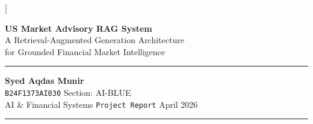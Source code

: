 \documentclass[10pt,a4paper,twocolumn]{article}
\begin{document}
\twocolumn[{%
  \begin{@twocolumnfalse}

    \vspace*{0.4cm}
    \begin{center}
      {\LARGE\bfseries\color{primaryblue}
        US Market Advisory RAG System\\[0.3em]
      }
      {\large\color{darkgray}
        A Retrieval-Augmented Generation Architecture\\
        for Grounded Financial Market Intelligence
      }

      \vspace{1.2em}
      \noindent\color{rulecolor}\rule{\linewidth}{1pt}
      \vspace{0.6em}

      {\normalsize\textbf{Syed Aqdas Munir}}\\[0.2em]
      {\small\color{darkgray}
        \texttt{B24F1373AI030} \quad\textbar\quad Section: AI-BLUE\\
        AI \& Financial Systems \quad\textbar\quad
        \texttt{Project Report} \quad\textbar\quad April 2026
      }

      \vspace{0.8em}
      \noindent\color{rulecolor}\rule{\linewidth}{0.4pt}
      \vspace{0.8em}
    \end{center}


\end{@twocolumnfalse}}
\end{document}
